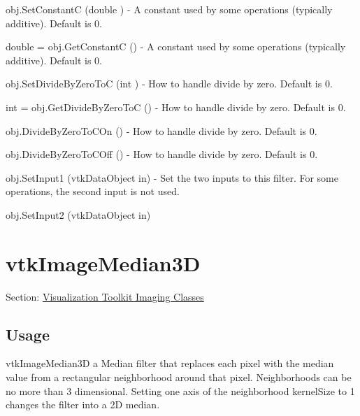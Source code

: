 \begin{DoxyItemize}
\item {\ttfamily obj.\-Set\-Constant\-C (double )} -\/ A constant used by some operations (typically additive). Default is 0.  
\item {\ttfamily double = obj.\-Get\-Constant\-C ()} -\/ A constant used by some operations (typically additive). Default is 0.  
\item {\ttfamily obj.\-Set\-Divide\-By\-Zero\-To\-C (int )} -\/ How to handle divide by zero. Default is 0.  
\item {\ttfamily int = obj.\-Get\-Divide\-By\-Zero\-To\-C ()} -\/ How to handle divide by zero. Default is 0.  
\item {\ttfamily obj.\-Divide\-By\-Zero\-To\-C\-On ()} -\/ How to handle divide by zero. Default is 0.  
\item {\ttfamily obj.\-Divide\-By\-Zero\-To\-C\-Off ()} -\/ How to handle divide by zero. Default is 0.  
\item {\ttfamily obj.\-Set\-Input1 (vtk\-Data\-Object in)} -\/ Set the two inputs to this filter. For some operations, the second input is not used.  
\item {\ttfamily obj.\-Set\-Input2 (vtk\-Data\-Object in)}  
\end{DoxyItemize}\hypertarget{vtkimaging_vtkimagemedian3d}{}\section{vtk\-Image\-Median3\-D}\label{vtkimaging_vtkimagemedian3d}
Section\-: \hyperlink{sec_vtkimaging}{Visualization Toolkit Imaging Classes} \hypertarget{vtkwidgets_vtkxyplotwidget_Usage}{}\subsection{Usage}\label{vtkwidgets_vtkxyplotwidget_Usage}
vtk\-Image\-Median3\-D a Median filter that replaces each pixel with the median value from a rectangular neighborhood around that pixel. Neighborhoods can be no more than 3 dimensional. Setting one axis of the neighborhood kernel\-Size to 1 changes the filter into a 2\-D median.

